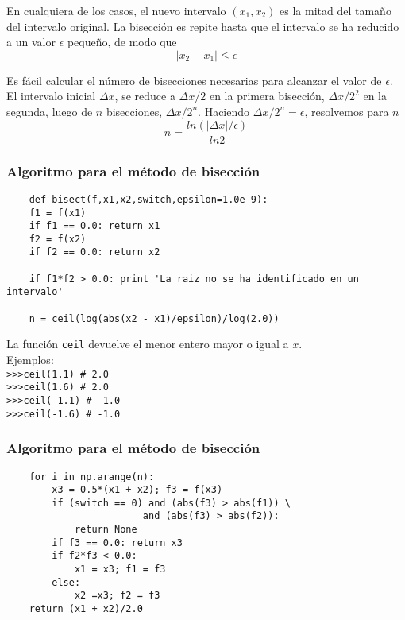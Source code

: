 \begin{frame}
En cualquiera de los casos, el nuevo intervalo $(x_{1}, x_{2})$ es la mitad del tamaño del intervalo original. La bisección es repite hasta que el intervalo se ha reducido a un valor $\epsilon$ pequeño, de modo que
\[ \vert x_{2} - x_{1} \vert \leq \epsilon\]
\end{frame}
\begin{frame}
Es fácil calcular el número de bisecciones necesarias para alcanzar el valor de $\epsilon$. El intervalo inicial $\Delta x$, se reduce a $\Delta x /2$ en la primera bisección, $\Delta x /2^{2}$ en la segunda, luego de $n$ bisecciones, $\Delta x /2^{n}$. Haciendo $\Delta x /2^{n} = \epsilon$, resolvemos para $n$
\[ n = \dfrac{ln(\vert \Delta x \vert/ \epsilon)}{ln 2}\]
\end{frame}
\begin{frame}[fragile]
\frametitle{Algoritmo para el método de bisección}
	\begin{lstlisting}
	def bisect(f,x1,x2,switch,epsilon=1.0e-9):
    f1 = f(x1)
    if f1 == 0.0: return x1
    f2 = f(x2)
    if f2 == 0.0: return x2
    
    if f1*f2 > 0.0: print 'La raiz no se ha identificado en un intervalo'

    n = ceil(log(abs(x2 - x1)/epsilon)/log(2.0))
	\end{lstlisting}
\end{frame}
\begin{frame}[fragile]
La función \texttt{ceil} devuelve el menor entero mayor o igual a $x$.
\\
\medskip
Ejemplos:\\
\medskip
\verb|>>>ceil(1.1) # 2.0| \\
\verb|>>>ceil(1.6) # 2.0| \\
\verb|>>>ceil(-1.1) # -1.0| \\
\verb|>>>ceil(-1.6) # -1.0|
\end{frame}
\begin{frame}[fragile]
\frametitle{Algoritmo para el método de bisección}
	\begin{lstlisting}
    for i in np.arange(n):
        x3 = 0.5*(x1 + x2); f3 = f(x3)
        if (switch == 0) and (abs(f3) > abs(f1)) \
                        and (abs(f3) > abs(f2)):
            return None
        if f3 == 0.0: return x3
        if f2*f3 < 0.0:
            x1 = x3; f1 = f3
        else:
            x2 =x3; f2 = f3
    return (x1 + x2)/2.0
	\end{lstlisting}

\end{frame}
